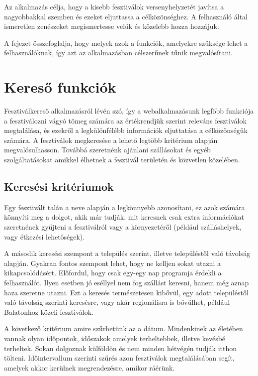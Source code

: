 
Az alkalmazás célja, hogy a kisebb fesztiválok versenyhelyzetét javítsa a nagyobbakkal szemben és ezeket eljuttassa a célközönséghez. A felhasználó által ismeretlen zenészeket megismertesse velük és közelebb hozza hozzájuk.

A fejezet összefoglalja, hogy melyek azok a funkciók, amelyekre szüksége lehet a felhasználóknak, így azt az alkalmazásban célszerűnek tűnik megvalósítani.

\section{Kereső funkciók}

Fesztiválkereső alkalmazásról lévén szó, így a webalkalmazásunk legfőbb funkciója a fesztiválozni vágyó tömeg számára az értékrendjük szerint releváns fesztiválok megtalálása, és ezekről a legkülönfélébb információk eljuttatása a célközönségük számára. A fesztiválok megkeresése a lehető legtöbb kritérium alapján megvalósulhasson. Továbbá szeretnénk ajánlani szállásokat és egyéb szolgáltatásokat amikkel élhetnek a fesztivál területén és közvetlen közelében.

\subsection{Keresési kritériumok}

Egy fesztivált talán a neve alapján a legkönnyebb azonosítani, ez azok számára könnyíti meg a dolgot, akik már tudják, mit keresnek csak extra információkat szeretnének gyűjteni a fesztiválról vagy a környezetéről (például szálláshelyek, vagy étkezési lehetőségek).

A második keresési szempont a település szerint, illetve településtől való távolság alapján. Gyakran fontos szempont lehet, hogy ne kelljen sokat utazni a kikapcsolódásért. Előfordul, hogy csak egy-egy nap programja érdekli a felhasználót. Ilyen esetben jó eséllyel nem fog szállást keresni, hanem még aznap haza szeretne utazni. Ezt a keresés természetesen kibővül, egy adott településtől való távolság szerinti keresésre, vagy akár regionálisra is bővülhet, például Balatonhoz közeli fesztiválok.

A következő kritérium amire szűrhetünk az a dátum. Mindenkinek az életében vannak olyan időpontok, időszakok amelyek terheltebbek, illetve kevésbé terheltek. Sokan dolgoznak külföldön és nem minden hétvégén tudják itthon tölteni. Időintervallum szerinti szűrés azon fesztiválok megtalálásában segít, amelyek akkor kerülnek megrendezésre, amikor ráérünk.

